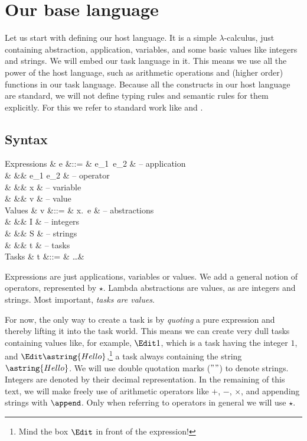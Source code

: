 
\section{Our base language}

Let us start with defining our host language.
It is a simple $\lambda$-calculus,
just containing abstraction, application, variables,
and some basic values like integers and strings.
We will embed our task language in it.
This means we use all the power of the host language,
such as arithmetic operations and (higher order) functions in our task language.
Because all the constructs in our host language are standard,
we will not define typing rules and semantic rules for them explicitly.
For this we refer to standard work like \textcite{pierce2002types} and \textcite{harper2016practical}.


\subsection{Syntax}

\begin{grammar}
  Expressions
    & e &::= & e_1\ e_2       & – application \\
    &   &\mid& e_1 \star e_2  & – operator \\
    &   &\mid& x              & – variable \\
    &   &\mid& v              & – value \\
  Values
    & v &::= & \lambda x.\ e  & – abstractions \\
    &   &\mid& I              & – integers \\
    &   &\mid& S              & – strings \\
    &   &\mid& t              & – tasks \\
  Tasks
    & t &::= & \ldots         &  \\
\end{grammar}
Expressions are just applications, variables or values.
We add a general notion of operators, represented by $\star$.
Lambda abstractions are values, as are integers and strings.
Most important, \emph{tasks are values}.

For now, the only way to create a task is by \emph{quoting} a pure expression
and thereby lifting it into the task world.
This means we can create very dull tasks containing values like, for example, $\Edit 1$,
which is a task having the integer $1$,
and $\Edit \astring{Hello}$,\footnote{
  Mind the box $\Edit$ in front of the expression!
}
a task always containing the string $\astring{Hello}$.
We will use double quotation marks ($""$) to denote strings.
Integers are denoted by their decimal representation.
In the remaining of this text,
we will make freely use of arithmetic operators like $+$, $-$, $\times$,
and appending strings with $\append$.
Only when referring to operators in general we will use $\star$.


